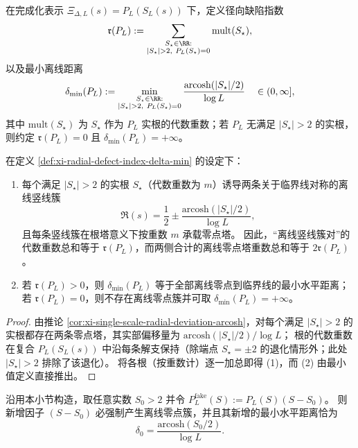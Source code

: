 \begin{definition}[径向缺陷指数与最小离线距离]\label{def:xi-radial-defect-index-delta-min}
在完成化表示 \(\Xi_{\Delta,L}(s)=P_L(S_L(s))\) 下，定义径向缺陷指数
\[
\mathfrak r(P_L)
:=\sum_{\substack{S_\star\in\RR:\\ |S_\star|>2,\ P_L(S_\star)=0}}
\mathrm{mult}(S_\star),
\]
以及最小离线距离
\[
\delta_{\min}(P_L)
:=\min_{\substack{S_\star\in\RR:\\ |S_\star|>2,\ P_L(S_\star)=0}}
\frac{\mathrm{arcosh}(|S_\star|/2)}{\log L}
\quad\in(0,\infty],
\]
其中 \(\mathrm{mult}(S_\star)\) 为 \(S_\star\) 作为 \(P_L\) 实根的代数重数；若 \(P_L\) 无满足 \(|S_\star|>2\) 的实根，则约定 \(\mathfrak r(P_L)=0\) 且 \(\delta_{\min}(P_L)=+\infty\)。
\end{definition}

\begin{proposition}\label{prop:xi-radial-defect-index-offcritical-lines}
在定义 \ref{def:xi-radial-defect-index-delta-min} 的设定下：
\begin{enumerate}
  \item 每个满足 \(|S_\star|>2\) 的实根 \(S_\star\)（代数重数为 \(m\)）诱导两条关于临界线对称的离线竖线簇
  \[
  \Re(s)=\frac12\pm \frac{\mathrm{arcosh}(|S_\star|/2)}{\log L},
  \]
  且每条竖线簇在根塔意义下按重数 \(m\) 承载零点塔。
  因此，“离线竖线簇对”的代数重数总和等于 \(\mathfrak r(P_L)\)，而两侧合计的离线零点塔重数总和等于 \(2\mathfrak r(P_L)\)。
  \item 若 \(\mathfrak r(P_L)>0\)，则 \(\delta_{\min}(P_L)\) 等于全部离线零点到临界线的最小水平距离；若 \(\mathfrak r(P_L)=0\)，则不存在离线零点簇并可取 \(\delta_{\min}(P_L)=+\infty\)。
\end{enumerate}
\end{proposition}

\begin{proof}
由推论 \ref{cor:xi-single-scale-radial-deviation-arcosh}，对每个满足 \(|S_\star|>2\) 的实根都存在两条零点塔，其实部偏移量为
\(
\mathrm{arcosh}(|S_\star|/2)/\log L
\)；
根的代数重数在复合 \(P_L(S_L(s))\) 中沿每条解支保持（除端点 \(S_\star=\pm 2\) 的退化情形外；此处 \(|S_\star|>2\) 排除了该退化）。
将各根（按重数计）逐一加总即得 (1)，而 (2) 由最小值定义直接推出。
\end{proof}

\begin{corollary}\label{cor:xi-fake-factor-forces-offcritical-distance}
沿用本小节构造，取任意实数 \(S_0>2\) 并令
\(
P^{\mathrm{fake}}_L(S):=P_L(S)(S-S_0)
\)。
则新增因子 \((S-S_0)\) 必强制产生离线零点簇，并且其新增的最小水平距离恰为
\[
\delta_0=\frac{\mathrm{arcosh}(S_0/2)}{\log L}.
\]
\end{corollary}

